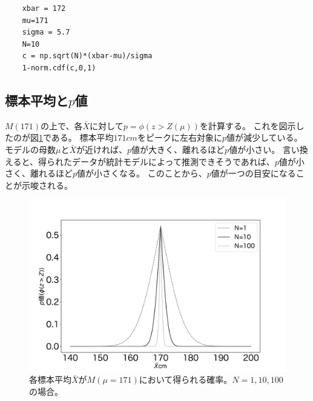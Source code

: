 \begin{lstlisting}
    xbar = 172
    mu=171
    sigma = 5.7
    N=10
    c = np.sqrt(N)*(xbar-mu)/sigma
    1-norm.cdf(c,0,1)
\end{lstlisting}

\subsection{標本平均と$p$値}
$M(171)$の上で、各$\bar{X}$に対して$p=\phi(z>Z(\mu))$を計算する。
これを図示したのが図\ref{fig:p_cm}である。
標本平均$171cm$をピークに左右対象に$p$値が減少している。
モデルの母数$\mu$と$\bar{X}$が近ければ、$p$値が大きく、離れるほど$p$値が小さい。
言い換えると、得られたデータが統計モデルによって推測できそうであれば、$p$値が小さく、離れるほど$p$値が小さくなる。
このことから、$p$値が一つの目安になることが示唆される。

\begin{figure}
\begin{center}
   \includegraphics[width=15cm]{./image/04_/p_cm.pdf}
   \caption{各標本平均$\bar{X}$が$M(\mu=171)$において得られる確率。$N=1,10,100$の場合。}
   \label{fig:p_cm}
 \end{center}
\end{figure}








